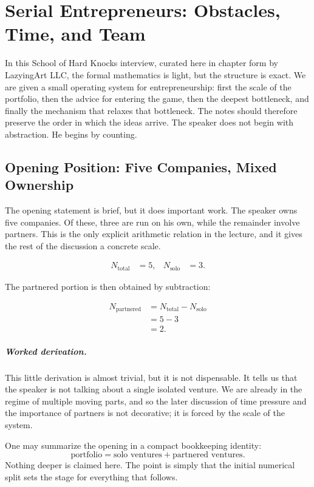\chapter{Serial Entrepreneurs: Obstacles, Time, and Team}

In this School of Hard Knocks interview, curated here in chapter form by LazyingArt LLC, the formal mathematics is light, but the structure is exact. We are given a small operating system for entrepreneurship: first the scale of the portfolio, then the advice for entering the game, then the deepest bottleneck, and finally the mechanism that relaxes that bottleneck. The notes should therefore preserve the order in which the ideas arrive. The speaker does not begin with abstraction. He begins by counting.

\section{Opening Position: Five Companies, Mixed Ownership}

The opening statement is brief, but it does important work. The speaker owns five companies. Of these, three are run on his own, while the remainder involve partners. This is the only explicit arithmetic relation in the lecture, and it gives the rest of the discussion a concrete scale.

\begin{align}
N_{\mathrm{total}} &= 5, &
N_{\mathrm{solo}} &= 3.
\end{align}

The partnered portion is then obtained by subtraction:

\begin{align}
N_{\mathrm{partnered}}
  &= N_{\mathrm{total}} - N_{\mathrm{solo}} \\
  &= 5 - 3 \\
  &= 2.
\end{align}

\paragraph{Worked derivation.}
This little derivation is almost trivial, but it is not dispensable. It tells us that the speaker is not talking about a single isolated venture. We are already in the regime of multiple moving parts, and so the later discussion of time pressure and the importance of partners is not decorative; it is forced by the scale of the system.

One may summarize the opening in a compact bookkeeping identity:
\begin{equation}
\text{portfolio} = \text{solo ventures} + \text{partnered ventures}.
\end{equation}
Nothing deeper is claimed here. The point is simply that the initial numerical split sets the stage for everything that follows.


